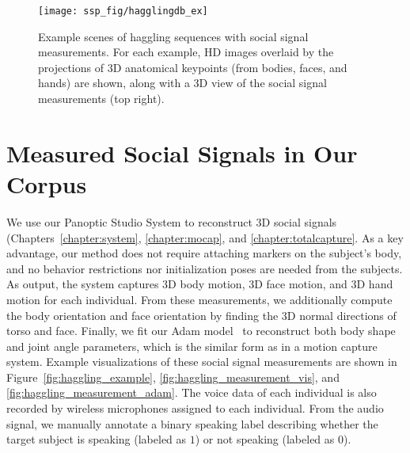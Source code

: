 \begin{figure}
	\centering
	\texttt{[image: ssp\_fig/hagglingdb\_ex]}
	\caption{Example scenes of haggling sequences with social signal measurements. For each example, HD images overlaid by the projections of 3D anatomical keypoints (from bodies, faces, and hands) are shown, along with a 3D view of the social signal measurements (top right).} 
	\label{fig:haggling_db}
\end{figure}

\section{Measured Social Signals in Our Corpus}
We use our Panoptic Studio System to reconstruct 3D social signals (Chapters~\ref{chapter:system}, \ref{chapter:mocap}, and  \ref{chapter:totalcapture}. As a key advantage, our method does not require attaching markers on the subject's body, and no behavior restrictions nor initialization poses are needed from the subjects. As output, the system captures 3D body motion, 3D face motion, and 3D hand motion for each individual. From these measurements, we additionally compute the body orientation and face orientation by finding the 3D normal directions of torso and face. Finally, we fit our Adam model~\cite{joo2018} to reconstruct both body shape and joint angle parameters, which is the similar form as in a motion capture system. Example visualizations of these social signal measurements are shown in Figure~\ref{fig:haggling_example}, \ref{fig:haggling_measurement_vis}, and \ref{fig:haggling_measurement_adam}. The voice data of each individual is also recorded by wireless microphones assigned to each individual. From the audio signal, we manually annotate a binary speaking label describing whether the target subject is speaking (labeled as $1$) or not speaking (labeled as $0$).



